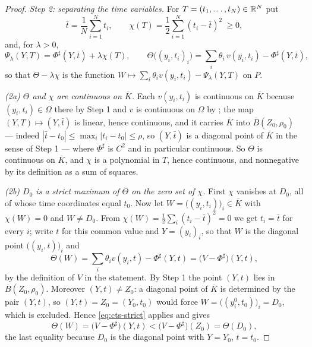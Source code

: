 \begin{proof}
\emph{Step 2: separating the time variables.}
For $T=(t_1,\dots,t_N)\in\mathbb{R}^N$ put
\[
  \bar t=\frac1N\sum_{i=1}^Nt_i,\qquad
  \chi(T)=\frac12\sum_{i=1}^N(t_i-\bar t)^2\ \ge0,
\]
and, for $\lambda>0$,
\[
  \Psi_\lambda(Y,T)=\Phi^\sharp(Y,\bar t)+\lambda\chi(T),
  \qquad
  \Theta\bigl((y_i,t_i)_i\bigr)=\sum_i\theta_i\,v(y_i,t_i)-\Phi^\sharp(Y,\bar t),
\]
so that $\Theta-\lambda\chi$ is the function
$W\mapsto\sum_i\theta_iv(y_i,t_i)-\Psi_\lambda(Y,T)$ on $P$.

\emph{(2a) $\Theta$ and $\chi$ are continuous on $\overline K$.}
Each $v(y_i,t_i)$ is continuous on $\overline K$ because $(y_i,t_i)\in\Omega$
there by Step 1 and $v$ is continuous on $\Omega$ by ;
the map $(Y,T)\mapsto(Y,\bar t)$ is linear, hence continuous, and it carries
$\overline K$ into $\overline B(Z_0,\rho_0)$ --- indeed
$|\bar t-t_0|\le\max_i|t_i-t_0|\le\rho$, so $(Y,\bar t)$ is a diagonal point of
$\overline K$ in the sense of Step 1 --- where $\Phi^\sharp$ is $C^2$ and in
particular continuous. So $\Theta$ is continuous on $\overline K$, and $\chi$ is
a polynomial in $T$, hence continuous, and nonnegative by its definition as a
sum of squares.

\emph{(2b) $D_0$ is a strict maximum of $\Theta$ on the zero set of $\chi$.}
First $\chi$ vanishes at $D_0$, all of whose time coordinates equal $t_0$.
Now let $W=\bigl((y_i,t_i)\bigr)_i\in\overline K$ with $\chi(W)=0$ and
$W\ne D_0$. From $\chi(W)=\tfrac12\sum_i(t_i-\bar t)^2=0$ we get $t_i=\bar t$
for every $i$; write $t$ for this common value and $Y=(y_i)_i$, so that $W$ is
the diagonal point $\bigl((y_i,t)\bigr)_i$ and
\[
  \Theta(W)=\sum_i\theta_iv(y_i,t)-\Phi^\sharp(Y,t)
   =\bigl(V-\Phi^\sharp\bigr)(Y,t),
\]
by the definition of $V$ in the statement. By Step 1 the point $(Y,t)$ lies in
$\overline B(Z_0,\rho_0)$. Moreover $(Y,t)\ne Z_0$: a diagonal point of
$\overline K$ is determined by the pair $(Y,t)$, so $(Y,t)=Z_0=(Y_0,t_0)$ would
force $W=\bigl((y_i^0,t_0)\bigr)_i=D_0$, which is excluded. Hence
\eqref{eq:cts-strict} applies and gives
\[
  \Theta(W)=\bigl(V-\Phi^\sharp\bigr)(Y,t)
   <\bigl(V-\Phi^\sharp\bigr)(Z_0)=\Theta(D_0),
\]
the last equality because $D_0$ is the diagonal point with $Y=Y_0$, $t=t_0$.


\end{proof}
